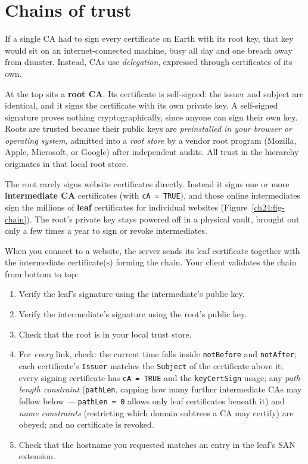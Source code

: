 \section{Chains of trust}
\label{ch24:chains}

If a single CA had to sign every certificate on Earth with its root key, that key would sit on an internet-connected machine, busy all day and one breach away from disaster. Instead, CAs use \emph{delegation}, expressed through certificates of its own.

At the top sits a \textbf{root CA}. Its certificate is self-signed: the issuer and subject are identical, and it signs the certificate with its own private key. A self-signed signature proves nothing cryptographically, since anyone can sign their own key. Roots are trusted because their public keys are \emph{preinstalled in your browser or operating system}, admitted into a \emph{root store} by a vendor root program (Mozilla, Apple, Microsoft, or Google) after independent audits. All trust in the hierarchy originates in that local root store.

The root rarely signs website certificates directly. Instead it signs one or more \textbf{intermediate CA} certificates (with \texttt{cA = TRUE}), and those online intermediates sign the millions of \textbf{leaf} certificates for individual websites (Figure~\ref{ch24:fig-chain}). The root's private key stays powered off in a physical vault, brought out only a few times a year to sign or revoke intermediates.

When you connect to a website, the server sends its leaf certificate together with the intermediate certificate(s) forming the chain. Your client validates the chain from bottom to top:

\begin{enumerate}
\item Verify the leaf's signature using the intermediate's public key.
\item Verify the intermediate's signature using the root's public key.
\item Check that the root is in your local trust store.
\item For \emph{every} link, check: the current time falls inside \texttt{notBefore} and \texttt{notAfter}; each certificate's \texttt{Issuer} matches the \texttt{Subject} of the certificate above it; every signing certificate has \texttt{cA = TRUE} and the \texttt{keyCertSign} usage; any \emph{path-length constraint} (\texttt{pathLen}, capping how many further intermediate CAs may follow below --- \texttt{pathLen = 0} allows only leaf certificates beneath it) and \emph{name constraints} (restricting which domain subtrees a CA may certify) are obeyed; and no certificate is revoked.
\item Check that the hostname you requested matches an entry in the leaf's SAN extension.
\end{enumerate}

